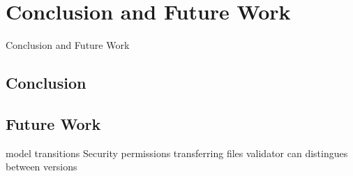 \chapter{Conclusion and Future Work}
\label{ch:conclusion}

Conclusion and Future Work
\section{Conclusion}

\section {Future Work}
model transitions
Security
permissions
transferring files 
validator can distingues between versions
